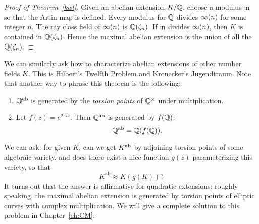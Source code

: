 \begin{proof}[Proof of Theorem~\ref{kwt}]
Given an abelian extension $K/\mathbb{Q}$, choose a modulus $\mathfrak{m}$ so that the Artin map is defined.
Every modulus for $\mathbb{Q}$ divides $\infty (n)$ for some integer $n$. The ray class field of $\infty (n)$ is $\mathbb{Q}(\zeta_n)$. If $\mathfrak{m}$ divides $\infty(n)$, then $K$ is contained in $\mathbb{Q}(\zeta_n)$. %
Hence the maximal abelian extension is the union of all the $\mathbb{Q}(\zeta_n)$.
\end{proof}
We can similarly ask how to characterize abelian extensions of other number fields $K$. This is Hilbert's Twelfth Problem and Kronecker's Jugendtraum. 
Note that another way to phrase this theorem is the following:
\begin{enumerate}
\item $\mathbb{Q}^{\text{ab}}$ is generated by the {\it torsion points} of $\mathbb{Q}^{\times}$ under multiplication.
\item Let $f(z)=e^{2\pi iz}$. Then $\mathbb{Q}^{\text{ab}}$ is generated by $f(\mathbb{Q})$:
\[
\mathbb{Q}^{\text{ab}}=\mathbb{Q}(f(\mathbb{Q})).
\]
\end{enumerate}
We can ask: for given $K$, can we get $K^{\text{ab}}$ by adjoining torsion points of some algebraic variety, and does there exist a nice function $g(z)$ parameterizing this variety, so that
\[
K^{\text{ab}}\approx K(g(K))?
\]
It turns out that the answer is affirmative for quadratic extensions: roughly speaking, the maximal abelian extension is generated by torsion points of elliptic curves with complex multiplication. We will give a complete solution to this problem in Chapter~\ref{ch:CM}.

